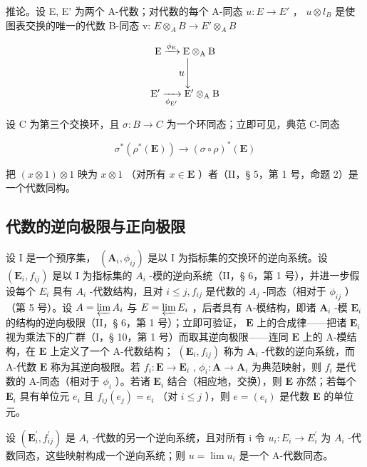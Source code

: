 推论。设 E, E' 为两个 A-代数；对代数的每个 A-同态 \(u: E \to E'\) ， \(u \otimes l_{B}\) 是使图表交换的唯一的代数 B-同态 v: \(E \otimes_{A} B \to E' \otimes_{A} B\)

\[
\begin{array}{c} \mathrm{E} \xrightarrow {\phi_ {\mathrm{E}}} \mathrm{E} \otimes_ {\mathrm{A}} \mathrm{B} \\ u \Biggl \downarrow \\ \mathrm{E} ^ {\prime} \xrightarrow [ \phi_ {\mathrm{E} ^ {\prime}} ]{} \mathrm{E} ^ {\prime} \otimes_ {\mathrm{A}} \mathrm{B} \end{array}
\]

设 C 为第三个交换环，且 \(\sigma: B \to C\) 为一个环同态；立即可见，典范 C-同态

\[
\sigma^ {*} (\rho^ {*} (\mathbf {E})) \rightarrow (\sigma \circ \rho) ^ {*} (\mathbf {E})
\]

把 \((x\otimes 1)\otimes 1\) 映为 \(x\otimes 1\) （对所有 \(x\in \mathbf{E}\) ）者（II，§ 5，第 1 号，命题 2）是一个代数同构。

\subsection{代数的逆向极限与正向极限}

设 I 是一个预序集， \((\mathbf{A}_{i},\phi_{ij})\) 是以 I 为指标集的交换环的逆向系统。设 \((\mathbf{E}_{i},f_{ij})\) 是以 I 为指标集的 \(A_{i}\) -模的逆向系统（II，§ 6，第 1 号），并进一步假设每个 \(E_{i}\) 具有 \(A_{i}\) -代数结构，且对 \(i\leqslant j,f_{ij}\) 是代数的 \(A_{j}\) -同态（相对于 \(\phi_{ij}\) ）（第 5 号）。设 \(A=\varprojlim A_{i}\) 与 \(E=\varprojlim E_{i}\) ，后者具有 A-模结构，即诸 \(\mathbf{A}_i\) -模 \(\mathbf{E}_i\) 的结构的逆向极限（II，§ 6，第 1 号）；立即可验证， \(\mathbf{E}\) 上的合成律——把诸 \(\mathbf{E}_i\) 视为乘法下的广群（I，§ 10，第 1 号）而取其逆向极限——连同 \(\mathbf{E}\) 上的 A-模结构，在 \(\mathbf{E}\) 上定义了一个 A-代数结构； \((\mathbf{E}_i, f_{ij})\) 称为 \(\mathbf{A}_i\) -代数的逆向系统，而 A-代数 \(\mathbf{E}\) 称为其逆向极限。若 \(f_i: \mathbf{E} \to \mathbf{E}_i\) , \(\phi_i: \mathbf{A} \to \mathbf{A}_i\) 为典范映射，则 \(f_i\) 是代数的 A-同态（相对于 \(\phi_i\) ）。若诸 \(\mathbf{E}_i\) 结合（相应地，交换），则 \(\mathbf{E}\) 亦然；若每个 \(\mathbf{E}_i\) 具有单位元 \(e_i\) 且 \(f_{ij}(e_j) = e_i\) （对 \(i \leqslant j\) ），则 \(e = (e_i)\) 是代数 \(\mathbf{E}\) 的单位元。

设 \((\mathbf{E}_{i}^{\prime}, f_{ij}^{\prime})\) 是 \(A_{i}\) -代数的另一个逆向系统，且对所有 i 令 \(u_{i}: E_{i} \to E_{i}^{\prime}\) 为 \(A_{i}\) -代数同态，这些映射构成一个逆向系统；则 \(u = \lim u_{i}\) 是一个 A-代数同态。

